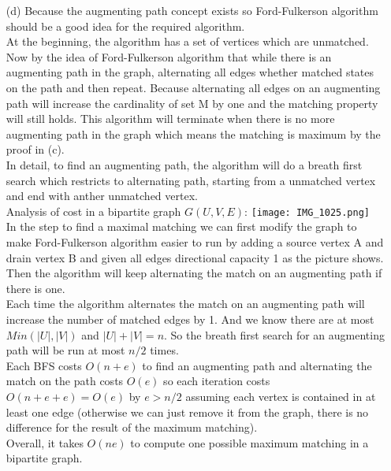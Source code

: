\documentclass[10pt,twoside,a4paper]{article}
\begin{document}
\begin{itemize}
\item[(d)] 
Because the augmenting path concept exists so Ford-Fulkerson algorithm should be a good idea for the required algorithm.
\\At the beginning, the algorithm has a set of vertices which are unmatched. Now by the idea of Ford-Fulkerson algorithm that while there is an augmenting path in the graph, alternating all edges whether matched states on the path and then repeat. Because alternating all edges on an augmenting path will increase the cardinality of set M by one and the matching property will still holds. This algorithm will terminate when there is no more augmenting path in the graph which means the matching is maximum by the proof in (c).
\\In detail, to find an augmenting path, the algorithm will do a breath first search which restricts to alternating path, starting from a unmatched vertex and end with anther unmatched vertex.
\\Analysis of cost in a bipartite graph $G(U,V,E)$:
\texttt{[image: IMG\_1025.png]} 
\\In the step to find a maximal matching we can first modify the graph to make Ford-Fulkerson algorithm easier to run by adding a source vertex A and drain vertex B and given all edges directional capacity 1 as the picture shows.
\\Then the algorithm will keep alternating the match on an augmenting path if there is one.
\\Each time the algorithm alternates the match on an augmenting path will increase the number of matched edges by 1. And we know there are at most $Min(|U|,|V|)$ and $|U|+|V|=n$. So the breath first search for an augmenting path will be run at most $n/2$ times.
\\Each BFS costs $O(n+e)$ to find an augmenting path and alternating the match on the path costs $O(e)$ so each iteration costs $O(n+e+e)=O(e)$ by $e>n/2$ assuming each vertex is contained in at least one edge (otherwise we can just remove it from the graph, there is no difference for the result of the maximum matching).
\\Overall, it takes $O(ne)$ to compute one possible maximum matching in a bipartite graph.


\end{itemize}
\end{document}
